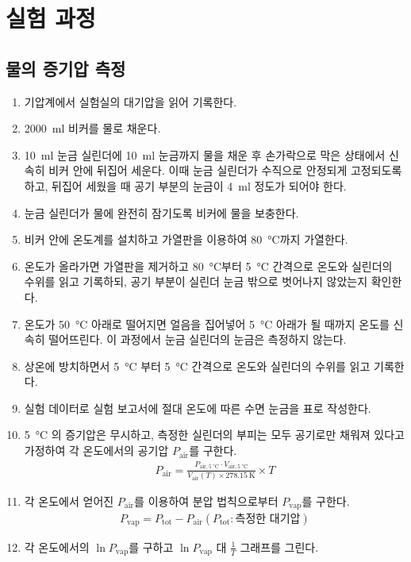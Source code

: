 \documentclass[a4paper,10pt]{article}
\begin{document}
	\section{실험 과정}
	
	\subsection{물의 증기압 측정}
	\begin{enumerate}
		\item 기압계에서 실험실의 대기압을 읽어 기록한다.
		\item \SI{2000}{\milli\litre} 비커를 물로 채운다.
		\item \SI{10}{\milli\litre} 눈금 실린더에 \SI{10}{\milli\litre} 눈금까지 물을 채운 후 손가락으로 막은 상태에서 신속히 비커 안에 뒤집어 세운다. 이때 눈금 실린더가 수직으로 안정되게 고정되도록 하고, 뒤집어 세웠을 때 공기 부분의 눈금이 \SI{4}{\milli\litre} 정도가 되어야 한다.
		\item 눈금 실린더가 물에 완전히 잠기도록 비커에 물을 보충한다.
		\item 비커 안에 온도계를 설치하고 가열판을 이용하여 \SI{80}{\degreeCelsius}까지 가열한다.
		\item 온도가 올라가면 가열판을 제거하고 \SI{80}{\degreeCelsius}부터 \SI{5}{\degreeCelsius} 간격으로 온도와 실린더의 수위를 읽고 기록하되, 공기 부분이 실린더 눈금 밖으로 벗어나지 않았는지 확인한다.
		\item 온도가 \SI{50}{\degreeCelsius} 아래로 떨어지면 얼음을 집어넣어 \SI{5}{\degreeCelsius} 아래가 될 때까지 온도를 신속히 떨어뜨린다. 이 과정에서 눈금 실린더의 눈금은 측정하지 않는다.
		\item 상온에 방치하면서 \SI{5}{\degreeCelsius} 부터 \SI{5}{\degreeCelsius} 간격으로 온도와 실린더의 수위를 읽고 기록한다.
		\item 실험 데이터로 실험 보고서에 절대 온도에 따른 수면 눈금을 표로 작성한다.
		\item \SI{5}{\degreeCelsius} 의 증기압은 무시하고, 측정한 실린더의 부피는 모두 공기로만 채워져 있다고 가정하여 각 온도에서의 공기압 $P_{\mathrm{air}}$를 구한다.
		\begin{gather*}
			P_{\mathrm{air}} = \frac{P_{\mathrm{air, \SI{5}{\degreeCelsius}}} \cdot V_{\mathrm{air, \SI{5}{\degreeCelsius}}}}{V_{\mathrm{air}}(T) \times \SI{278.15}{\kelvin}} \times T
		\end{gather*}
		\item 각 온도에서 얻어진 $P_{\mathrm{air}}$를 이용하여 분압 법칙으로부터 $P_{\mathrm{vap}}$를 구한다.
		\begin{gather*}
			P_{\mathrm{vap}} = P_{\mathrm{tot}} - P_{\mathrm{air}}
			(P_{\mathrm{tot}} : \text{측정한 대기압})
		\end{gather*}
		\item 각 온도에서의 $\ln P_{\mathrm{vap}}$를 구하고 $\ln P_{\mathrm{vap}}$ 대 $\frac{1}{T}$ 그래프를 그린다.
	\end{enumerate}
\end{document}
